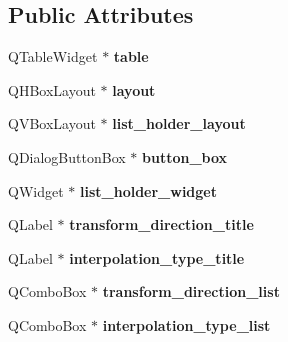\subsection*{Public Attributes}
\begin{DoxyCompactItemize}
\item 
Q\+Table\+Widget $\ast$ {\bfseries table}\hypertarget{class_selected_point_widget_af975e399fc7a609981722bda4dbeea28}{}\label{class_selected_point_widget_af975e399fc7a609981722bda4dbeea28}

\item 
Q\+H\+Box\+Layout $\ast$ {\bfseries layout}\hypertarget{class_selected_point_widget_a9bc3e002ad38008034fa18e34c136e32}{}\label{class_selected_point_widget_a9bc3e002ad38008034fa18e34c136e32}

\item 
Q\+V\+Box\+Layout $\ast$ {\bfseries list\+\_\+holder\+\_\+layout}\hypertarget{class_selected_point_widget_a6305deed174162dbddab977db14bcc28}{}\label{class_selected_point_widget_a6305deed174162dbddab977db14bcc28}

\item 
Q\+Dialog\+Button\+Box $\ast$ {\bfseries button\+\_\+box}\hypertarget{class_selected_point_widget_aad58e8b55b796c4c60ec77e60ec70c5d}{}\label{class_selected_point_widget_aad58e8b55b796c4c60ec77e60ec70c5d}

\item 
Q\+Widget $\ast$ {\bfseries list\+\_\+holder\+\_\+widget}\hypertarget{class_selected_point_widget_a16b8e10427ac123e0d0a218a20b708a7}{}\label{class_selected_point_widget_a16b8e10427ac123e0d0a218a20b708a7}

\item 
Q\+Label $\ast$ {\bfseries transform\+\_\+direction\+\_\+title}\hypertarget{class_selected_point_widget_a69ea9e8a79fd9f1b508742b9ad71ef87}{}\label{class_selected_point_widget_a69ea9e8a79fd9f1b508742b9ad71ef87}

\item 
Q\+Label $\ast$ {\bfseries interpolation\+\_\+type\+\_\+title}\hypertarget{class_selected_point_widget_a8f260244a3198fa2e5d1d52dea031ae5}{}\label{class_selected_point_widget_a8f260244a3198fa2e5d1d52dea031ae5}

\item 
Q\+Combo\+Box $\ast$ {\bfseries transform\+\_\+direction\+\_\+list}\hypertarget{class_selected_point_widget_a08e55d0422a889983c7d4ba36d322f68}{}\label{class_selected_point_widget_a08e55d0422a889983c7d4ba36d322f68}

\item 
Q\+Combo\+Box $\ast$ {\bfseries interpolation\+\_\+type\+\_\+list}\hypertarget{class_selected_point_widget_a55451a9a8351fa26bffd964d20422edc}{}\label{class_selected_point_widget_a55451a9a8351fa26bffd964d20422edc}

\end{DoxyCompactItemize}


